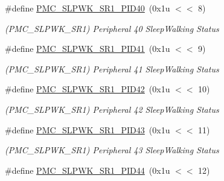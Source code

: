 \begin{DoxyCompactItemize}
\mbox{\label{group__SAME70__PMC_gaf6c8dbbddcffcae7dc4dfe25953829d3}} 
\#define \mbox{\hyperlink{group__SAME70__PMC_gaf6c8dbbddcffcae7dc4dfe25953829d3}{P\+M\+C\+\_\+\+S\+L\+P\+W\+K\+\_\+\+S\+R1\+\_\+\+P\+I\+D40}}~(0x1u $<$$<$ 8)
\begin{DoxyCompactList}\small\item\em (P\+M\+C\+\_\+\+S\+L\+P\+W\+K\+\_\+\+S\+R1) Peripheral 40 Sleep\+Walking Status \end{DoxyCompactList}\item 
\mbox{\label{group__SAME70__PMC_ga70b657db5cb6144083d30b99c43de6ee}} 
\#define \mbox{\hyperlink{group__SAME70__PMC_ga70b657db5cb6144083d30b99c43de6ee}{P\+M\+C\+\_\+\+S\+L\+P\+W\+K\+\_\+\+S\+R1\+\_\+\+P\+I\+D41}}~(0x1u $<$$<$ 9)
\begin{DoxyCompactList}\small\item\em (P\+M\+C\+\_\+\+S\+L\+P\+W\+K\+\_\+\+S\+R1) Peripheral 41 Sleep\+Walking Status \end{DoxyCompactList}\item 
\mbox{\label{group__SAME70__PMC_ga6d4a43241f683a33688eff8f4879729d}} 
\#define \mbox{\hyperlink{group__SAME70__PMC_ga6d4a43241f683a33688eff8f4879729d}{P\+M\+C\+\_\+\+S\+L\+P\+W\+K\+\_\+\+S\+R1\+\_\+\+P\+I\+D42}}~(0x1u $<$$<$ 10)
\begin{DoxyCompactList}\small\item\em (P\+M\+C\+\_\+\+S\+L\+P\+W\+K\+\_\+\+S\+R1) Peripheral 42 Sleep\+Walking Status \end{DoxyCompactList}\item 
\mbox{\label{group__SAME70__PMC_gad720766db8b402dbf29662afb9f13a75}} 
\#define \mbox{\hyperlink{group__SAME70__PMC_gad720766db8b402dbf29662afb9f13a75}{P\+M\+C\+\_\+\+S\+L\+P\+W\+K\+\_\+\+S\+R1\+\_\+\+P\+I\+D43}}~(0x1u $<$$<$ 11)
\begin{DoxyCompactList}\small\item\em (P\+M\+C\+\_\+\+S\+L\+P\+W\+K\+\_\+\+S\+R1) Peripheral 43 Sleep\+Walking Status \end{DoxyCompactList}\item 
\mbox{\label{group__SAME70__PMC_gad69d384d0755e302da023e0af787c654}} 
\#define \mbox{\hyperlink{group__SAME70__PMC_gad69d384d0755e302da023e0af787c654}{P\+M\+C\+\_\+\+S\+L\+P\+W\+K\+\_\+\+S\+R1\+\_\+\+P\+I\+D44}}~(0x1u $<$$<$ 12)
$$
\end{DoxyCompactItemize}
